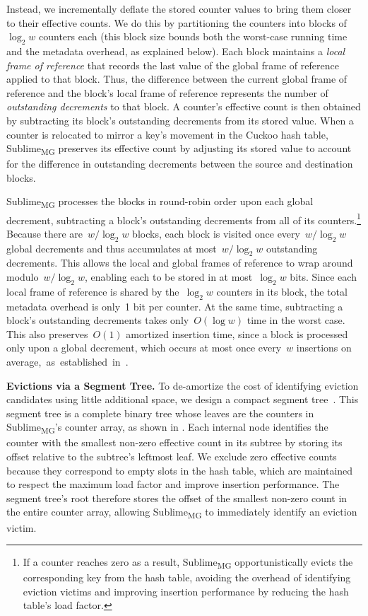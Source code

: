 \documentclass[sigconf]{acmart}
\newcommand{\sketch}{Sublime}
\newcommand{\sketchmg}{\sketch\textsubscript{MG}\xspace}
\begin{document}
Instead, we incrementally deflate the stored counter values to bring them closer to their effective counts.
We do this by partitioning the counters into blocks of~$\log_2 w$ counters each (this block size bounds both the worst-case running time and the metadata overhead, as explained below).
Each block maintains a \emph{local frame of reference} that records the last value of the global frame of reference applied to that block.
Thus, the difference between the current global frame of reference and the block's local frame of reference represents the number of \emph{outstanding decrements} to that block.
A counter's effective count is then obtained by subtracting its block's outstanding decrements from its stored value.
When a counter is relocated to mirror a key's movement in the Cuckoo hash table, \sketchmg preserves its effective count by adjusting its stored value to account for the difference in outstanding decrements between the source and destination blocks.


\sketchmg processes the blocks in round-robin order upon each global decrement, subtracting a block's outstanding decrements from all of its counters.\footnote{
    If a counter reaches zero as a result, \sketchmg opportunistically evicts the corresponding key from the hash table, avoiding the overhead of identifying eviction victims and improving insertion performance by reducing the hash table's load factor.
}
Because there are~$w/\log_2 w$ blocks, each block is visited once every~$w/\log_2 w$ global decrements and thus accumulates at most~$w/\log_2 w$ outstanding decrements.
This allows the local and global frames of reference to wrap around modulo~$w/\log_2 w$, enabling each to be stored in at most~$\log_2 w$ bits.
Since each local frame of reference is shared by the~$\log_2 w$ counters in its block, the total metadata overhead is only~1 bit per counter.
At the same time, subtracting a block's outstanding decrements takes only~$O(\log w)$ time in the worst case.
This also preserves~$O(1)$ amortized insertion time, since a block is processed only upon a global decrement, which occurs at most once every~$w$ insertions on \mbox{average, as established in }.

\textbf{Evictions via a Segment Tree.}
To de-amortize the cost of identifying eviction candidates using little additional space, we design a compact segment tree~\cite{SegmentTree1,SegmentTree2,CG}.
This segment tree is a complete binary tree whose leaves are the counters in \sketchmg's counter array, as shown in .
Each internal node identifies the counter with the smallest non-zero effective count in its subtree by storing its offset relative to the subtree's leftmost leaf.
We exclude zero effective counts because they correspond to empty slots in the hash table, which are maintained to respect the maximum load factor and improve insertion performance.
The segment tree's root therefore stores the offset of the smallest non-zero count in the entire counter array, allowing \sketchmg to immediately identify an eviction victim.
\end{document}
